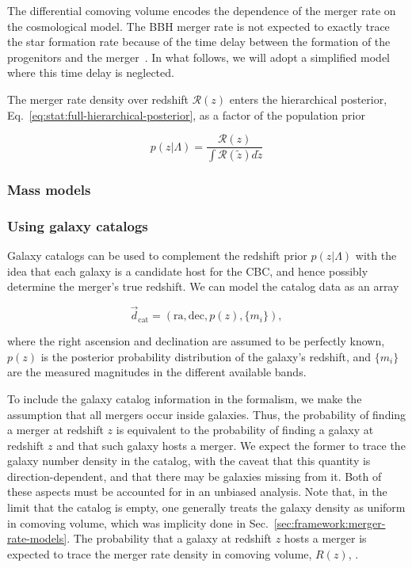 \documentclass[%
preprint,
nofootinbib,
 amsmath,amssymb,
 aps,
]{revtex4-2}
\newcommand{\given}[2]{p( #1 | #2 )}
\newcommand{\bv}[1]{{\color{red}{[BV: #1]}}}
\begin{document}
The differential comoving volume encodes the dependence of the merger rate on the cosmological
model. The BBH merger rate is not expected to exactly trace the star formation rate because of the
time delay between the formation of the progenitors and the
merger~\cite{santoliquido_cosmic_2020,fishbach_time_2021,van_son_redshift_2022}. In what follows,
we will adopt a simplified model where this time delay is neglected.

The merger rate density over redshift $\mathcal{R}(z)$ enters the hierarchical posterior,
Eq.~\eqref{eq:stat:full-hierarchical-posterior}, as a factor of the population prior

\begin{equation}
	\given{z}{\Lambda} = \frac{\mathcal{R}(z)}{\int \mathcal{R}(\tilde{z}) d\tilde{z}}
\end{equation}

\subsubsection{Mass models}

\bv{TODO}

\subsubsection{Using galaxy catalogs}

Galaxy catalogs can be used to complement the redshift prior $\given{z}{\Lambda}$ with the idea
that each galaxy is a candidate host for the CBC, and hence possibly determine the merger's true
redshift. We can model the catalog data as an array

\begin{equation}
	\vec{d}_\text{cat} = (\text{ra}, \text{dec}, p(z), \{m_i\}),
\end{equation}

where the right ascension and declination are assumed to be perfectly known, $p(z)$ is the
posterior probability distribution of the galaxy's redshift, and $\{m_i\}$ are the measured
magnitudes in the different available bands.

To include the galaxy catalog information in the formalism, we make the assumption that all mergers
occur inside galaxies. Thus, the probability of finding a merger at redshift $z$ is equivalent to
the probability of finding a galaxy at redshift $z$ and that such galaxy hosts a merger. We expect
the former to trace the galaxy number density in the catalog, with the caveat that this quantity is
direction-dependent, and that there may be galaxies missing from it. Both of these aspects must be
accounted for in an unbiased analysis. Note that, in the limit that the catalog is empty, one
generally treats the galaxy density as uniform in comoving volume, which was implicity done in
Sec.~\ref{sec:framework:merger-rate-models}. The probability that a galaxy at redshift $z$ hosts a
merger is expected to trace the merger rate density in comoving volume, $R(z)$, \bv{modulo a
	transformation to source-frame time}.
\end{document}
